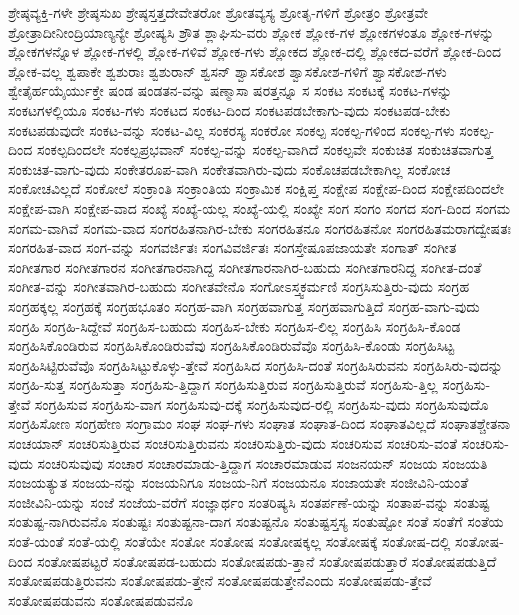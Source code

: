 {ಶ್ರೇಷ್ಠವ್ಯಕ್ತಿ-ಗಳೇ
ಶ್ರೇಷ್ಠಸುಖ
ಶ್ರೇಷ್ಠಸ್ತತ್ತದೇವೇತರೋ
ಶ್ರೋತವ್ಯಸ್ಯ
ಶ್ರೋತೃ-ಗಳಿಗೆ
ಶ್ರೋತ್ರಂ
ಶ್ರೋತ್ರವೇ
ಶ್ರೋತ್ರಾದೀನೀಂದ್ರಿಯಾಣ್ಯನ್ಯೇ
ಶ್ರೋಷ್ಯಸಿ
ಶ್ರೌತ
ಶ್ಲಾಘಿಸು-ವರು
ಶ್ಲೋಕ
ಶ್ಲೋಕ-ಗಳ
ಶ್ಲೋಕಗಳಂತೂ
ಶ್ಲೋಕ-ಗಳನ್ನು
ಶ್ಲೋಕಗಳನ್ನೊಳ
ಶ್ಲೋಕ-ಗಳಲ್ಲಿ
ಶ್ಲೋಕ-ಗಳಿವೆ
ಶ್ಲೋಕ-ಗಳು
ಶ್ಲೋಕದ
ಶ್ಲೋಕ-ದಲ್ಲಿ
ಶ್ಲೋಕದ-ವರೆಗೆ
ಶ್ಲೋಕ-ದಿಂದ
ಶ್ಲೋಕ-ವಲ್ಲ
ಶ್ವಪಾಕೇ
ಶ್ವಶುರಾಃ
ಶ್ವಶುರಾನ್
ಶ್ವಸನ್
ಶ್ವಾಸಕೋಶ
ಶ್ವಾಸಕೋಶ-ಗಳಿಗೆ
ಶ್ವಾಸಕೋಶ-ಗಳು
ಶ್ವೇತೈರ್ಹಯೈರ್ಯುಕ್ತೇ
ಷಂಡ
ಷಂಡತನ-ವನ್ನು
ಷಣ್ಮಾಸಾ
ಷರತ್ತನ್ನೂ
ಸ
ಸಂಕಟ
ಸಂಕಟಕ್ಕೆ
ಸಂಕಟ-ಗಳನ್ನು
ಸಂಕಟಗಳಲ್ಲಿಯೂ
ಸಂಕಟ-ಗಳು
ಸಂಕಟದ
ಸಂಕಟ-ದಿಂದ
ಸಂಕಟಪಡಬೇಕಾಗು-ವುದು
ಸಂಕಟಪಡ-ಬೇಕು
ಸಂಕಟಪಡುವುದೇ
ಸಂಕಟ-ವನ್ನು
ಸಂಕಟ-ವಿಲ್ಲ
ಸಂಕರಸ್ಯ
ಸಂಕರೋ
ಸಂಕಲ್ಪ
ಸಂಕಲ್ಪ-ಗಳಿಂದ
ಸಂಕಲ್ಪ-ಗಳು
ಸಂಕಲ್ಪ-ದಿಂದ
ಸಂಕಲ್ಪದಿಂದಲೇ
ಸಂಕಲ್ಪಪ್ರಭವಾನ್
ಸಂಕಲ್ಪ-ವನ್ನು
ಸಂಕಲ್ಪ-ವಾಗಿದೆ
ಸಂಕಲ್ಪವೇ
ಸಂಕುಚಿತ
ಸಂಕುಚಿತವಾಗುತ್ತ
ಸಂಕುಚಿತ-ವಾಗು-ವುದು
ಸಂಕೇತರೂಪ-ವಾಗಿ
ಸಂಕೇತವಾಗಿರು-ವುದು
ಸಂಕೊಚಪಡಬೇಕಾಗಿಲ್ಲ
ಸಂಕೋಚ
ಸಂಕೋಚವಿಲ್ಲದೆ
ಸಂಕೋಲೆ
ಸಂಕ್ರಾಂತಿ
ಸಂಕ್ರಾಂತಿಯ
ಸಂಕ್ರಾಮಿಕ
ಸಂಕ್ಷಿಪ್ತ
ಸಂಕ್ಷೇಪ
ಸಂಕ್ಷೇಪ-ದಿಂದ
ಸಂಕ್ಷೇಪದಿಂದಲೇ
ಸಂಕ್ಷೇಪ-ವಾಗಿ
ಸಂಕ್ಷೇಪ-ವಾದ
ಸಂಖ್ಯೆ
ಸಂಖ್ಯೆ-ಯಲ್ಲ
ಸಂಖ್ಯೆ-ಯಲ್ಲಿ
ಸಂಖ್ಯೇ
ಸಂಗ
ಸಂಗಂ
ಸಂಗದ
ಸಂಗ-ದಿಂದ
ಸಂಗಮ
ಸಂಗಮ-ವಾಗಿವೆ
ಸಂಗಮ-ವಾದ
ಸಂಗರಹಿತನಾಗಿರ-ಬೇಕು
ಸಂಗರಹಿತನೂ
ಸಂಗರಹಿತನೋ
ಸಂಗರಹಿತಮರಾಗದ್ವೇಷತಃ
ಸಂಗರಹಿತ-ವಾದ
ಸಂಗ-ವನ್ನು
ಸಂಗವರ್ಜಿತಃ
ಸಂಗವಿವರ್ಜಿತಃ
ಸಂಗಸ್ತೇಷೂಪಜಾಯತೇ
ಸಂಗಾತ್
ಸಂಗೀತ
ಸಂಗೀತಗಾರ
ಸಂಗೀತಗಾರನ
ಸಂಗೀತಗಾರನಾಗಿದ್ದ
ಸಂಗೀತಗಾರನಾಗಿರ-ಬಹುದು
ಸಂಗೀತಗಾರನಿದ್ದ
ಸಂಗೀತ-ದಂತೆ
ಸಂಗೀತ-ವನ್ನು
ಸಂಗೀತವಾಗಿರ-ಬಹುದು
ಸಂಗೀತವೇನೊ
ಸಂಗೋಽಸ್ತ್ವಕರ್ಮಣಿ
ಸಂಗ್ರಸಿಸುತ್ತಿರು-ವುದು
ಸಂಗ್ರಹ
ಸಂಗ್ರಹಕ್ಕಲ್ಲ
ಸಂಗ್ರಹಕ್ಕೆ
ಸಂಗ್ರಹಭೂತಂ
ಸಂಗ್ರಹ-ವಾಗಿ
ಸಂಗ್ರಹವಾಗುತ್ತ
ಸಂಗ್ರಹವಾಗುತ್ತಿದೆ
ಸಂಗ್ರಹ-ವಾಗು-ವುದು
ಸಂಗ್ರಹಿ
ಸಂಗ್ರಹಿ-ಸಿದ್ದೇವೆ
ಸಂಗ್ರಹಿಸ-ಬಹುದು
ಸಂಗ್ರಹಿಸ-ಬೇಕು
ಸಂಗ್ರಹಿಸ-ಲಿಲ್ಲ
ಸಂಗ್ರಹಿಸಿ
ಸಂಗ್ರಹಿಸಿ-ಕೊಂಡ
ಸಂಗ್ರಹಿಸಿಕೊಂಡಿರುವ
ಸಂಗ್ರಹಿಸಿಕೊಂಡಿರುವೆವು
ಸಂಗ್ರಹಿಸಿಕೊಂಡಿರುವೆವೊ
ಸಂಗ್ರಹಿಸಿ-ಕೊಂಡು
ಸಂಗ್ರಹಿಸಿಟ್ಟ
ಸಂಗ್ರಹಿಸಿಟ್ಟಿರುವೆವೊ
ಸಂಗ್ರಹಿಸಿಟ್ಟುಕೊಳ್ಳು-ತ್ತೇವೆ
ಸಂಗ್ರಹಿಸಿದ
ಸಂಗ್ರಹಿಸಿ-ದಂತೆ
ಸಂಗ್ರಹಿಸಿರುವನು
ಸಂಗ್ರಹಿಸಿರು-ವುದನ್ನು
ಸಂಗ್ರಹಿ-ಸುತ್ತ
ಸಂಗ್ರಹಿಸುತ್ತಾ
ಸಂಗ್ರಹಿಸು-ತ್ತಿದ್ದಾಗ
ಸಂಗ್ರಹಿಸುತ್ತಿರುವ
ಸಂಗ್ರಹಿಸುತ್ತಿರುವೆ
ಸಂಗ್ರಹಿಸು-ತ್ತಿಲ್ಲ
ಸಂಗ್ರಹಿಸು-ತ್ತೇವೆ
ಸಂಗ್ರಹಿಸುವ
ಸಂಗ್ರಹಿಸು-ವಾಗ
ಸಂಗ್ರಹಿಸುವು-ದಕ್ಕೆ
ಸಂಗ್ರಹಿಸುವುದ-ರಲ್ಲಿ
ಸಂಗ್ರಹಿಸು-ವುದು
ಸಂಗ್ರಹಿಸುವುದೊ
ಸಂಗ್ರಹಿಸೋಣ
ಸಂಗ್ರಹೇಣ
ಸಂಗ್ರಾಮಂ
ಸಂಘ
ಸಂಘ-ಗಳು
ಸಂಘಾತ
ಸಂಘಾತ-ದಿಂದ
ಸಂಘಾತವಿಲ್ಲದೆ
ಸಂಘಾತಶ್ಚೇತನಾ
ಸಂಚಯಾನ್
ಸಂಚರಿಸುತ್ತಿರುವ
ಸಂಚರಿಸುತ್ತಿರುವನು
ಸಂಚರಿಸುತ್ತಿರು-ವುದು
ಸಂಚರಿಸುವ
ಸಂಚರಿಸು-ವಂತೆ
ಸಂಚರಿಸು-ವುದು
ಸಂಚರಿಸುವುವು
ಸಂಚಾರ
ಸಂಚಾರಮಾಡು-ತ್ತಿದ್ದಾಗ
ಸಂಚಾರಮಾಡುವ
ಸಂಜನಯನ್
ಸಂಜಯ
ಸಂಜಯತಿ
ಸಂಜಯತ್ಯುತ
ಸಂಜಯ-ನನ್ನು
ಸಂಜಯನಿಗೂ
ಸಂಜಯ-ನಿಗೆ
ಸಂಜಯನೂ
ಸಂಜಾಯತೇ
ಸಂಜೀವಿನಿ-ಯಂತೆ
ಸಂಜೀವಿನಿ-ಯನ್ನು
ಸಂಜೆ
ಸಂಜೆಯ-ವರೆಗೆ
ಸಂಜ್ಞಾರ್ಥಂ
ಸಂತರಿಷ್ಯಸಿ
ಸಂತರ್ಪಣೆ-ಯನ್ನು
ಸಂತಾಪ-ವನ್ನು
ಸಂತುಷ್ಟ
ಸಂತುಷ್ಟ-ನಾಗಿರುವನೊ
ಸಂತುಷ್ಟಃ
ಸಂತುಷ್ಟನಾ-ದಾಗ
ಸಂತುಷ್ಟನೊ
ಸಂತುಷ್ಟಸ್ತಸ್ಯ
ಸಂತುಷ್ಟೋ
ಸಂತೆ
ಸಂತೆಗೆ
ಸಂತೆಯ
ಸಂತೆ-ಯಂತೆ
ಸಂತೆ-ಯಲ್ಲಿ
ಸಂತೆಯೇ
ಸಂತೋ
ಸಂತೋಷ
ಸಂತೋಷಕ್ಕಲ್ಲ
ಸಂತೋಷಕ್ಕೆ
ಸಂತೋಷ-ದಲ್ಲಿ
ಸಂತೋಷ-ದಿಂದ
ಸಂತೋಷಪಟ್ಟರೆ
ಸಂತೋಷಪಡ-ಬಹುದು
ಸಂತೋಷಪಡು-ತ್ತಾನೆ
ಸಂತೋಷಪಡುತ್ತಾರೆ
ಸಂತೋಷಪಡುತ್ತಿದೆ
ಸಂತೋಷಪಡುತ್ತಿರುವನು
ಸಂತೋಷಪಡು-ತ್ತೇನೆ
ಸಂತೋಷಪಡುತ್ತೇನೆಎಂದು
ಸಂತೋಷಪಡು-ತ್ತೇವೆ
ಸಂತೋಷಪಡುವನು
ಸಂತೋಷಪಡುವನೊ
}
